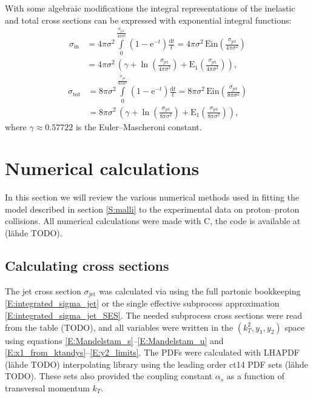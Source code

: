 \documentclass[a4paper, twoside, english, 12pt]{article}
\begin{document}
With some algebraic modifications the integral representations of the inelastic and total cross sections can be expressed with exponential integral functions:
\begin{align}
	\sigma_\text{in} &= 4\pi\sigma^2\int\limits_0^{\frac{\sigma_\text{jet}}{4\pi\sigma^2}} \left(1-\text{e}^{-t}\right)\frac{\text{d}t}{t} = 4\pi\sigma^2\,\text{Ein}(\frac{\sigma_\text{jet}}{4\pi\sigma^2}) \nonumber\\[0.6em] 
	&= 4\pi\sigma^2\,\left(\gamma+\ln(\frac{\sigma_\text{jet}}{4\pi\sigma^2})+\text{E}_1(\frac{\sigma_\text{jet}}{4\pi\sigma^2})\right), \label{E:sigma_in_ei} 
\end{align}
\begin{align}
	\sigma_\text{tot} &= 8\pi\sigma^2\int\limits_0^{\frac{\sigma_\text{jet}}{8\pi\sigma^2}} \left(1-\text{e}^{-t}\right)\frac{\text{d}t}{t} =  8\pi\sigma^2\,\text{Ein}(\frac{\sigma_\text{jet}}{8\pi\sigma^2})  \nonumber\\[0.6em] 
	&= 8\pi\sigma^2\,\left(\gamma+\ln(\frac{\sigma_\text{jet}}{8\pi\sigma^2})+\text{E}_1(\frac{\sigma_\text{jet}}{8\pi\sigma^2})\right), \label{E:sigma_tot_ei}
\end{align}
where $\gamma\approx 0.57722$ is the Euler--Mascheroni constant.


\section{Numerical calculations}


In this section we will review the various numerical methods used in fitting the model described in section \ref{S:malli} to the experimental data on proton--proton collisions. All numerical calculations were made with C\nolinebreak[4]\hspace{-.05em}\raisebox{.4ex}{\tiny\bf ++}, the code is available at (lähde TODO).

\subsection{Calculating cross sections}\label{SS:numerical_sigma_jet}

The jet cross section $\sigma_{\text{jet}}$ was calculated via using the full partonic bookkeeping \eqref{E:integrated_sigma_jet} or the single effective subprocess approximation \eqref{E:integrated_sigma_jet_SES}. The needed subprocess cross sections were read from the table (TODO), and all variables were written in the $(k_T^2,y_1,y_2)$ space using equations \eqref{E:Mandelstam_s}--\eqref{E:Mandelstam_u} and \eqref{E:x1_from_ktandys}--\eqref{E:y2_limits}. The PDFs were calculated with LHAPDF (lähde TODO) interpolating library using the leading order ct14 PDF sets (lähde TODO). These sets also provided the coupling constant $\alpha_s$ as a function of transversal momentum $k_T$.
\end{document}
